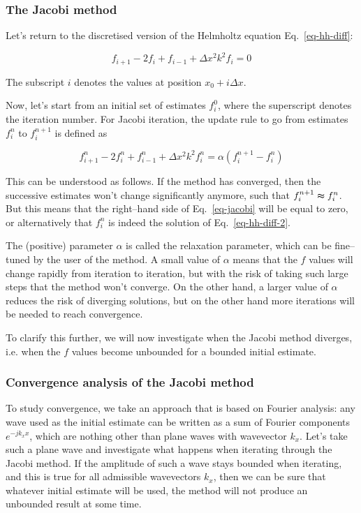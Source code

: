 \subsubsection{The Jacobi method}

Let's return to the discretised version of the Helmholtz equation Eq.~\ref{eq-hh-diff}:

\begin{equation}
f_{i+1} -2 f_i + f_{i-1} +  \Delta x^2 k^2 f_i = 0 \label{eq-hh-diff-2}
\end{equation}  

The subscript $i$ denotes the values at position $x_0 + i \Delta x$.

Now, let's start from an initial set of estimates $f_i^0$, where the superscript denotes the iteration number. For Jacobi iteration, the update rule to go from estimates $f_i^n$ to $ f_i^{n+1}$ is defined as

\begin{equation}
f_{i+1}^n -2 f_i^n + f_{i-1}^n +  \Delta x^2 k^2 f_i^n = \alpha (f_i^{n+1} - f_i^n ) \label{eq-jacobi}
\end{equation}  

This can be understood as follows. If the method has converged, then the successive estimates won't change significantly anymore, such that $ f_i^{n+1} \thickapprox f_i^n $. But this means that the right--hand side of Eq.~\ref{eq-jacobi} will be equal to zero, or alternatively that $f_i^n$ is indeed the solution of Eq.~\ref{eq-hh-diff-2}.

The (positive) parameter $\alpha$ is called the relaxation parameter, which can be fine--tuned by the user of the method. A small value of $\alpha$ means that the $f$ values will change rapidly from iteration to iteration, but with the risk of taking such large steps that the method won't converge. On the other hand, a larger value of $\alpha$ reduces the risk of diverging solutions, but on the other hand more iterations will be needed to reach convergence.

To clarify this further, we will now investigate when the Jacobi method diverges, i.e. when the $f$ values become unbounded for a bounded initial estimate.

\subsubsection{Convergence analysis of the Jacobi method}

To study convergence, we take an approach that is based on Fourier analysis: any wave used as the initial estimate can be written as a sum of Fourier components $e^{-j k_x x}$, which are nothing other than plane waves with wavevector $k_x$. Let's take such a plane wave and investigate what happens when iterating through the Jacobi method. If the amplitude of such a wave stays bounded when iterating, and this is true for all admissible wavevectors $k_x$, then we can be sure that whatever initial estimate will be used, the method will not produce an unbounded result at some time.

